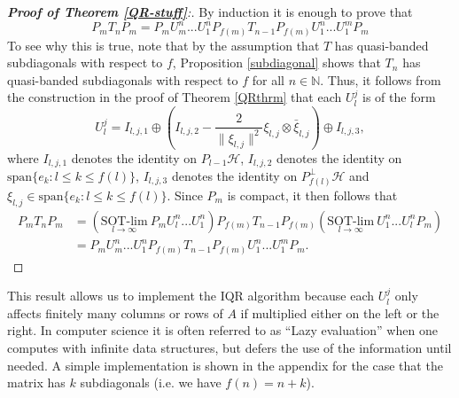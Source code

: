 \documentclass[a4paper,10pt]{article}
\begin{document}
\begin{proof}[\textbf{Proof of Theorem \ref{QR-stuff}}:]
By induction it is enough to prove that
\begin{equation}
\label{obvious}
P_mT_nP_m=P_mU_m^n...U_1^nP_{f(m)}T_{n-1}P_{f(m)}U_1^n...U_1^mP_m
\end{equation}
To see why this is true, note that by the assumption that $T$ has quasi-banded subdiagonals with respect to $f$, Proposition \ref{subdiagonal} shows that $T_n$ has quasi-banded subdiagonals with respect to $f$ for all $n \in \mathbb{N}.$ Thus, it follows from the construction in the proof of Theorem \ref{QRthrm} that each $U^j_l$ is of the form 
$$
U^j_l = I_{l,j,1} \oplus \left(I_{l,j,2} - \frac{2}{\|\xi_{l,j}\|^2} \xi_{l,j}\otimes \bar \xi_{l,j}
\right)\oplus I_{l,j,3},
$$ 
where $I_{l,j,1}$ denotes the identity on $P_{l-1}\mathcal{H}$, $I_{l,j,2}$ denotes the identity on $\mathrm{span}\{e_k:l\leq k\leq f(l)\}$, $I_{l,j,3}$ denotes the identity on $P_{f(l)}^{\perp}\mathcal{H}$ and $\xi_{l,j}\in\mathrm{span}\{e_k:l\leq k\leq f(l)\}$. Since $P_m$ is compact, it then follows that
\begin{equation}\label{11}
\begin{split}
P_mT_nP_m &= (\underset{l \rightarrow \infty}{\text{SOT-lim}}\ P_m U_l^n...U_1^n)P_{f(m)}T_{n-1}P_{f(m)}(\underset{l \rightarrow \infty}{\text{SOT-lim}}\  U_1^n...U_l^nP_m)\\
&=P_mU_m^n...U_1^nP_{f(m)}T_{n-1}P_{f(m)}U_1^n...U_1^mP_m.
\end{split}
\end{equation}
\end{proof}



\begin{remark}
This result allows us to implement the IQR algorithm because each $U^j_l$ only affects finitely many columns or rows of $A$ if multiplied either on the left or the right. In computer science
it is often referred to as ``Lazy evaluation'' when one computes with infinite data structures, but defers the use of the information until needed. A simple implementation is shown in the appendix for the case that the matrix has $k$ subdiagonals (i.e. we have $f(n)=n+k$).
\end{remark}


\end{document}
